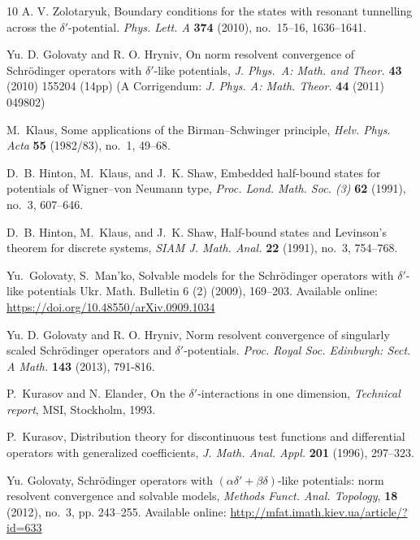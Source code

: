 \documentclass[reqno]{amsart}
\theoremstyle{definition}
\theoremstyle{remark}
\numberwithin{equation}{section}
\begin{document}
\begin{thebibliography}{10}
    A. V. Zolotaryuk,
    Boundary conditions for the states with resonant tunnelling across the $\delta'$-potential.
    \textit{Phys. Lett. A}  {\bf 374} (2010), no.~15--16, 1636--1641.


    Yu. D. Golovaty and R. O. Hryniv,
    {On norm resolvent convergence of Schr\"{o}dinger operators with $\delta'$-like potentials},
   \textit{J. Phys.~A: Math. and Theor.} \textbf{43} (2010) 155204 (14pp) (A Corrigendum: \textit{J. Phys. A: Math. Theor.} \textbf{44} (2011) 049802)


    M.~Klaus,
    Some applications of the Birman--Schwinger principle,
    \textit{Helv. Phys. Acta} \textbf{55} (1982/83), no.~1, 49--68.

    D.~B. Hinton, M.~Klaus, and J.~K. Shaw,
    Embedded half-bound states for potentials of Wigner–von Neumann type,
    \textit{Proc. Lond. Math. Soc. (3)} \textbf{62} (1991), no.~3, 607--646.

    D.~B. Hinton, M.~Klaus, and J.~K. Shaw,
    Half-bound states and Levinson's theorem for discrete systems,
    \textit{SIAM J. Math. Anal.} \textbf{22} (1991), no.~3, 754--768.

 Yu.~Golovaty,  S.~Man'ko,
    Solvable models for the Schr\"odinger operators
    with $\delta'$-like potentials     { Ukr. Math. Bulletin} {6} (2) (2009), 169--203. Available online:
    \url{https://doi.org/10.48550/arXiv.0909.1034}


    Yu. D. Golovaty and R. O. Hryniv,
    Norm resolvent convergence of singularly scaled Schr\"{o}dinger operators and $\delta'$-potentials.
    \textit{Proc. Royal Soc. Edinburgh: Sect. A Math.} \textbf{143} (2013),  791-816.

    P.~Kurasov and N. Elander,
    On the $\delta'$-interactions in one dimension,
    \textit{Technical report}, MSI, Stockholm, 1993.


    P.~Kurasov,
    Distribution theory for discontinuous test functions and differential operators with generalized coefficients,
    \textit{J. Math. Anal. Appl.} \textbf{201} (1996), 297--323.

    Yu. Golovaty,
    Schr\"odinger operators with $(\alpha\delta'+\beta\delta)$-like potentials: norm resolvent convergence and solvable models,
    \textit{Methods Funct. Anal. Topology}, \textbf{18} (2012), no.~3, pp. 243--255. Available online:
    \url{http://mfat.imath.kiev.ua/article/?id=633}



\end{thebibliography}
\end{document}
